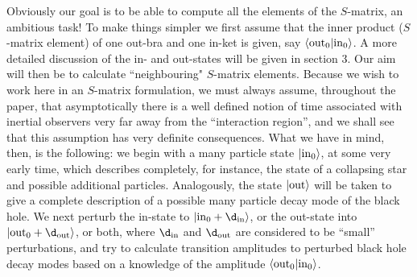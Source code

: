 Obviously our goal is to be able to compute all the elements of the
$S$-matrix, an ambitious task! To make things simpler we first assume
that the inner product ($S$-matrix element) of one out-bra and one
in-ket is given, say $\langle {\rm out}_0|{\rm in}_0\rangle$.  A more
detailed discussion of the in- and out-states will be given in section
3. Our aim will then be to calculate ``neighbouring" $S$-matrix
elements. Because we wish to work here in an $S$-matrix formulation, we
must always assume, throughout the paper, that asymptotically there is
a well defined notion of time associated with inertial observers very
far away from the ``interaction region'', and we shall see that this
assumption has very definite consequences. What we have in mind, then,
is the following: we begin with a many particle state $|{\rm
in}_0\rangle$, at some very early time, which describes completely, for
instance,  the state of a collapsing star and possible additional
particles. Analogously, the state $|{\rm out}\rangle$ will be taken to
give a complete description of a possible many particle decay mode of
the black hole. We next perturb the in-state
to $|{\rm in}_0+\d_{{\rm in}}\rangle$, or the out-state into  $|{\rm
out}_0+\d_{{\rm out}}\rangle$, or both, where $\d_{{\rm in}}$ and
$\d_{\rm out}$ are
considered to be ``small'' perturbations, and try to calculate
transition amplitudes to perturbed black hole decay modes based on a
knowledge of the amplitude $\langle {\rm out}_0|{\rm in}_0\rangle$.

